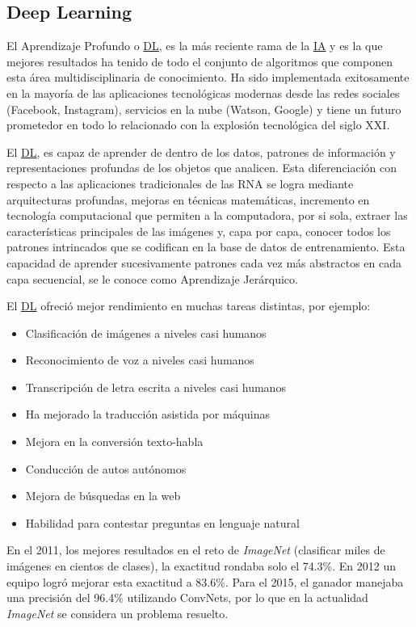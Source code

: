 \subsection{Deep Learning}

El Aprendizaje Profundo o \hyperlink{abbr}{DL}, es la más reciente rama de la
\hyperlink{abbr}{IA} y es la que mejores resultados ha tenido de todo el
conjunto de algoritmos que componen esta área multidisciplinaria de
conocimiento. Ha sido implementada exitosamente en la mayoría de las
aplicaciones tecnológicas modernas desde las redes sociales (Facebook,
Instagram), servicios en la nube (Watson, Google) y tiene un futuro prometedor
en todo lo relacionado con la explosión tecnológica del siglo XXI.

El \hyperlink{abbr}{DL}, es capaz de aprender de dentro de los datos, patrones
de información y representaciones profundas de los objetos que analicen. Esta
diferenciación con respecto a las aplicaciones tradicionales de las RNA se logra
mediante arquitecturas profundas, mejoras en técnicas matemáticas, incremento en
tecnología computacional que permiten a la computadora, por si sola, extraer las
características principales de las imágenes y, capa por capa, conocer todos los
patrones intrincados que se codifican en la base de datos de entrenamiento. Esta
capacidad de aprender sucesivamente patrones cada vez más abstractos en cada
capa secuencial, se le conoce como Aprendizaje Jerárquico. 

El \hyperlink{abbr}{DL} ofreció mejor rendimiento en muchas tareas distintas, por ejemplo:

\begin{itemize}
    \item Clasificación de imágenes a niveles casi humanos
    \item Reconocimiento de voz a niveles casi humanos
    \item Transcripción de letra escrita a niveles casi humanos
    \item Ha mejorado la traducción asistida por máquinas
    \item Mejora en la conversión texto-habla
    \item Conducción de autos autónomos
    \item Mejora de búsquedas en la web
    \item Habilidad para contestar preguntas en lenguaje natural
\end{itemize}

En el 2011, los mejores resultados en el reto de \emph{ImageNet} (clasificar
miles de imágenes en cientos de clases), la exactitud rondaba solo el 74.3\%. En
2012 un equipo logró mejorar esta exactitud a 83.6\%. Para el 2015, el ganador
manejaba una precisión del 96.4\% utilizando ConvNets, por lo que en la
actualidad \emph{ImageNet} se considera un problema resuelto.

